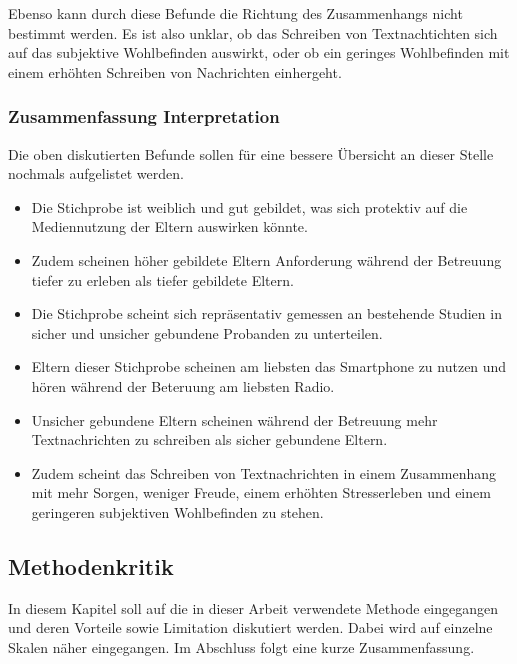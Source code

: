 Ebenso kann durch diese Befunde die Richtung des Zusammenhangs nicht bestimmt werden. Es ist also unklar, ob das Schreiben von Textnachtichten sich auf das subjektive Wohlbefinden auswirkt, oder ob ein geringes Wohlbefinden mit einem erhöhten Schreiben von Nachrichten einhergeht.  


\subsubsection{Zusammenfassung Interpretation}
Die oben diskutierten Befunde sollen für eine bessere Übersicht an dieser Stelle nochmals aufgelistet werden.
\begin{itemize}
    \item Die Stichprobe ist weiblich und gut gebildet, was sich protektiv auf die Mediennutzung der Eltern auswirken könnte.  
    \item Zudem scheinen höher gebildete Eltern Anforderung während der Betreuung tiefer zu erleben als tiefer gebildete Eltern.
    \item Die Stichprobe scheint sich repräsentativ gemessen an bestehende Studien in sicher und unsicher gebundene Probanden zu unterteilen.
    \item Eltern dieser Stichprobe scheinen am liebsten das Smartphone zu nutzen und hören während der Beteruung am liebsten Radio.
    \item Unsicher gebundene Eltern scheinen während der Betreuung mehr Textnachrichten zu schreiben als sicher gebundene Eltern. 
    \item Zudem scheint das Schreiben von Textnachrichten in einem Zusammenhang mit mehr Sorgen, weniger Freude, einem erhöhten Stresserleben und einem geringeren subjektiven Wohlbefinden zu stehen. 
\end{itemize}


\subsection{Methodenkritik} \label{sec:Methodenkritik}
In diesem Kapitel soll auf die in dieser Arbeit verwendete Methode eingegangen  und deren Vorteile sowie Limitation diskutiert werden. Dabei wird auf einzelne Skalen näher eingegangen. Im Abschluss folgt eine kurze Zusammenfassung.

